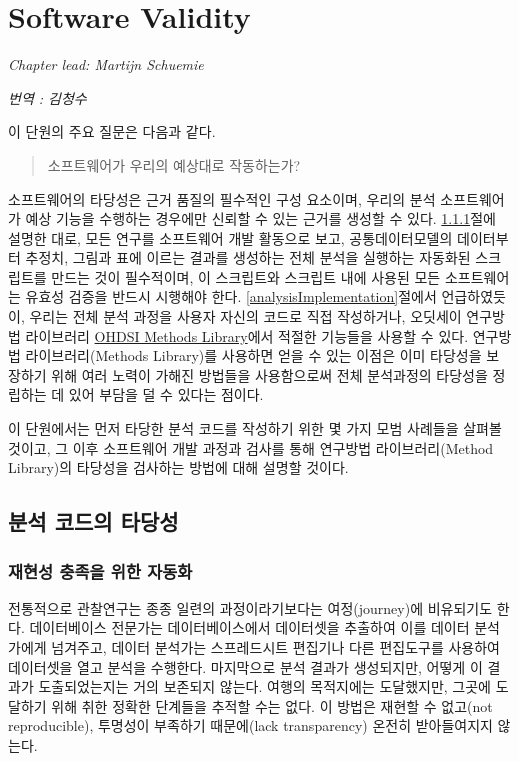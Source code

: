 \documentclass[11pt]{book}
\theoremstyle{definition}
\theoremstyle{definition}
\theoremstyle{definition}
\theoremstyle{remark}
\begin{document}
\chapter{Software Validity}\label{SoftwareValidity}

\emph{Chapter lead: Martijn Schuemie}

\emph{번역 : 김청수}

이 단원의 주요 질문은 다음과 같다.

\begin{quote}
소프트웨어가 우리의 예상대로 작동하는가?
\end{quote}

소프트웨어의 타당성은 근거 품질의 필수적인 구성 요소이며, 우리의 분석
소프트웨어가 예상 기능을 수행하는 경우에만 신뢰할 수 있는 근거를 생성할
수 있다. \ref{automation}절에 설명한 대로, 모든 연구를 소프트웨어 개발
활동으로 보고, 공통데이터모델의 데이터부터 추정치, 그림과 표에 이르는
결과를 생성하는 전체 분석을 실행하는 자동화된 스크립트를 만드는 것이
필수적이며, 이 스크립트와 스크립트 내에 사용된 모든 소프트웨어는 유효성
검증을 반드시 시행해야 한다. \ref{analysisImplementation}절에서
언급하였듯이, 우리는 전체 분석 과정을 사용자 자신의 코드로 직접
작성하거나, 오딧세이 연구방법 라이브러리
\href{https://ohdsi.github.io/MethodsLibrary/}{OHDSI Methods
Library}에서 적절한 기능들을 사용할 수 있다. 연구방법 라이브러리(Methods
Library)를 사용하면 얻을 수 있는 이점은 이미 타당성을 보장하기 위해 여러
노력이 가해진 방법들을 사용함으로써 전체 분석과정의 타당성을 정립하는 데
있어 부담을 덜 수 있다는 점이다. 

이 단원에서는 먼저 타당한 분석 코드를 작성하기 위한 몇 가지 모범
사례들을 살펴볼 것이고, 그 이후 소프트웨어 개발 과정과 검사를 통해
연구방법 라이브러리(Method Library)의 타당성을 검사하는 방법에 대해
설명할 것이다. 

\section{분석 코드의 타당성}\label{--}

\subsection{재현성 충족을 위한 자동화}\label{automation}

전통적으로 관찰연구는 종종 일련의 과정이라기보다는 여정(journey)에
비유되기도 한다. 데이터베이스 전문가는 데이터베이스에서 데이터셋을
추출하여 이를 데이터 분석가에게 넘겨주고, 데이터 분석가는 스프레드시트
편집기나 다른 편집도구를 사용하여 데이터셋을 열고 분석을 수행한다.
마지막으로 분석 결과가 생성되지만, 어떻게 이 결과가 도출되었는지는 거의
보존되지 않는다. 여행의 목적지에는 도달했지만, 그곳에 도달하기 위해 취한
정확한 단계들을 추적할 수는 없다. 이 방법은 재현할 수 없고(not
reproducible), 투명성이 부족하기 때문에(lack transparency) 온전히
받아들여지지 않는다. 
\end{document}
